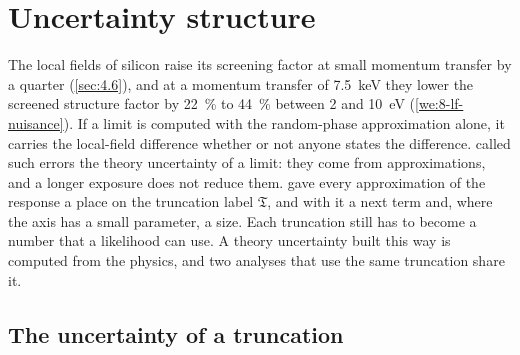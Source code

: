 \section{Uncertainty structure}\label{sec:8.8}

The local fields of silicon raise its screening factor at small momentum transfer by a quarter (\cref{sec:4.6}), and at a momentum transfer of \SI{7.5}{keV} they lower the screened structure factor by \SI{22}{\percent} to \SI{44}{\percent} between 2 and \SI{10}{eV} (\cref{we:8-lf-nuisance}). If a limit is computed with the random-phase approximation alone, it carries the local-field difference whether or not anyone states the difference.  called such errors the theory uncertainty of a limit: they come from approximations, and a longer exposure does not reduce them.  gave every approximation of the response a place on the truncation label $\mathfrak{T}$, and with it a next term and, where the axis has a small parameter, a size. Each truncation still has to become a number that a likelihood can use. A theory uncertainty built this way is computed from the physics, and two analyses that use the same truncation share it.

\subsection{The uncertainty of a truncation}

